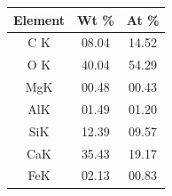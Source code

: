 \begin{minipage}{\textwidth}
\begin{minipage}[b]{0.32\textwidth}
    \label{fig:00-08-select}
  \end{minipage}
  \hfill
  \begin{minipage}[b]{0.32\textwidth}
    \centering
    \begin{tabular}{|c|c|c|}
      \hline
      Element & Wt \%  & At \%  \\ \hline
      C K     & 08.04 & 14.52 \\ \hline
      O K     & 40.04 & 54.29 \\ \hline
      MgK     & 00.48 & 00.43 \\ \hline
      AlK     & 01.49 & 01.20 \\ \hline
      SiK     & 12.39 & 09.57 \\ \hline
      CaK     & 35.43 & 19.17 \\ \hline
      FeK     & 02.13 & 00.83 \\ \hline
      \end{tabular}
    \label{tab:00-08}
  \end{minipage}
\end{minipage}


